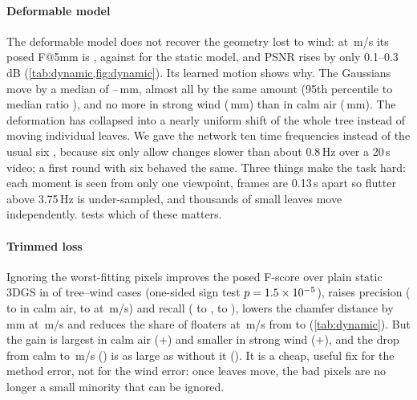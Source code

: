 \documentclass[preprint,11pt,authoryear]{elsarticle}
\begin{document}
\paragraph{Deformable model}\label{sec:dynamic} The deformable model does not recover the geometry lost to wind: at \WindMax\,m/s its posed F@5mm is \DyPosedFHi{}, against \StPosedFHi{} for the static model, and PSNR rises by only 0.1--0.3\,dB (\cref{tab:dynamic,fig:dynamic}). Its learned motion shows why. The Gaussians move by a median of \DyOffMin--\DyOffMax\,mm, almost all by the same amount (95th percentile to median ratio \DyOffRatio), and no more in strong wind (\DyOffHi\,mm) than in calm air (\DyOffCalm\,mm). The deformation has collapsed into a nearly uniform shift of the whole tree instead of moving individual leaves. We gave the network ten time frequencies instead of the usual six \citep{yang2024deformable}, because six only allow changes slower than about 0.8\,Hz over a 20\,s video; a first round with six behaved the same. Three things make the task hard: each moment is seen from only one viewpoint, frames are 0.13\,s apart so flutter above 3.75\,Hz is under-sampled, and thousands of small leaves move independently.  tests which of these matters.

\paragraph{Trimmed loss} Ignoring the worst-fitting pixels improves the posed F-score over plain static 3DGS in \RbWins{} of \RbConds{} tree--wind cases (one-sided sign test $p = 1.5\times10^{-5}$), raises precision (\StPrecCalm{} to \RbPrecCalm{} in calm air, \StPrecHi{} to \RbPrecHi{} at \WindMax\,m/s) and recall (\StRecCalm{} to \RbRecCalm, \StRecHi{} to \RbRecHi), lowers the chamfer distance by \RbCDGainHi\,mm at \WindMax\,m/s and reduces the share of floaters at \WindMax\,m/s from \StFloatHi{} to \RbFloatHi{} (\cref{tab:dynamic}). But the gain is largest in calm air ($+$\RbGainCalm{}) and smaller in strong wind ($+$\RbGainHi{}), and the drop from calm to \WindMax\,m/s (\RbWindDrop{}) is as large as without it (\StWindDropPosed{}). It is a cheap, useful fix for the method error, not for the wind error: once leaves move, the bad pixels are no longer a small minority that can be ignored.

\begin{table}[!tbp]
\centering\small
\caption{Static, trimmed-loss and deformable 3DGS (noisy data, \NDynTrees{} trees), compared with the rest pose and with the true leaf positions. Prec., Rec.: leaf precision and recall within 5\,mm; Floaters: share of points more than 3\,cm from any surface; Prec., Rec.\ and Floaters use the true leaf positions.}
\label{tab:dynamic}
\resizebox{\linewidth}{!}{}
\end{table}
\end{document}
